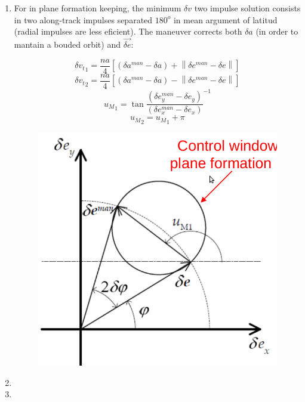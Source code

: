 \documentclass[a4paper]{report}
\newcommand\norm[1]{\left\lVert#1\right\rVert}
\begin{document}
\begin{enumerate}[label=\emph{\alph*)}]
  \item %
    For in plane formation keeping, the minimum $\delta v$ two impulse solution consists in two along-track impulses separated $180^o$ in mean argument of latitud (radial impulses are less eficient). The maneuver corrects both $\delta a$ (in order to mantain a bouded orbit) and $\vec{\delta e}$:\\
    \begin{figure}[h]
    \begin{minipage}{0.5\textwidth}
      \[\delta {v_t}_1 = \frac{n a}{4} \left[ (\delta a^{man} - \delta a) + \norm{\delta e^{man} - \delta e} \right] \]
      \[\delta {v_t}_2 = \frac{n a}{4} [(\delta a^{man} - \delta a) - \norm{\delta e^{man} - \delta e}] \]
      \[{u_M}_1 = \tan{\frac{(\delta e_y^{man}-\delta e_y)}{(\delta e_x^{man} - \delta e_x)}}^{-1} \]
      \[{u_M}_2 = {u_M}_1 + \pi \]
    \end{minipage}
    \begin{minipage}{0.5\textwidth}
	\centering
	\includegraphics[width=\textwidth]{In-plane_maneuvre}
    \end{minipage}
  \end{figure}

  \item %

  \item %

\end{enumerate}
\end{document}
